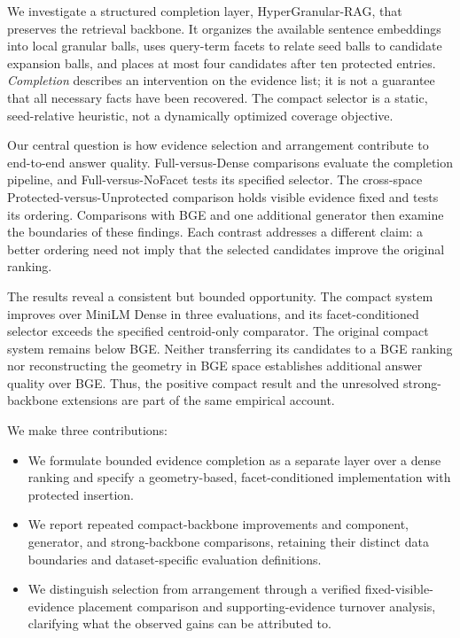 \documentclass[11pt]{article}
\newcommand{\hgrag}{HyperGranular-RAG\xspace}
\begin{document}
We investigate a structured completion layer, \hgrag, that preserves the
retrieval backbone. It organizes the available sentence embeddings into local
granular balls, uses query-term facets to relate seed balls to candidate
expansion balls, and places at most four candidates after ten protected
entries. \emph{Completion} describes an intervention on the evidence list; it is
not a guarantee that all necessary facts have been recovered. The compact
selector is a static, seed-relative heuristic, not a dynamically optimized
coverage objective.

Our central question is how evidence selection and arrangement contribute to
end-to-end answer quality. Full-versus-Dense comparisons evaluate the
completion pipeline, and Full-versus-NoFacet tests its specified selector.
The cross-space Protected-versus-Unprotected comparison holds visible evidence
fixed and tests its ordering. Comparisons with BGE and one additional
generator then examine the boundaries of these findings. Each contrast
addresses a different claim: a better ordering need not imply that the
selected candidates improve the original ranking.

The results reveal a consistent but bounded opportunity. The compact system
improves over MiniLM Dense in three evaluations, and its facet-conditioned
selector exceeds the specified centroid-only comparator. The original compact
system remains below BGE. Neither transferring its candidates to a BGE
ranking nor reconstructing the geometry in BGE space establishes additional
answer quality over BGE. Thus, the positive compact result and the unresolved
strong-backbone extensions are part of the same empirical account.

We make three contributions:
\begin{itemize}
\item We formulate bounded evidence completion as a separate layer over a
dense ranking and specify a geometry-based, facet-conditioned implementation
with protected insertion.
\item We report repeated compact-backbone improvements and component,
generator, and strong-backbone comparisons, retaining their distinct data
boundaries and dataset-specific evaluation definitions.
\item We distinguish selection from arrangement through a verified
fixed-visible-evidence placement comparison and supporting-evidence turnover
analysis, clarifying what the observed gains can be attributed to.
\end{itemize}
\end{document}
